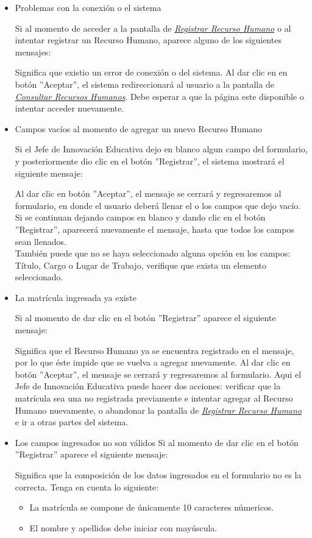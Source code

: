 \begin{itemize}
	\item Problemas con la conexión o el sistema

	Si al momento de acceder a la pantalla de \hyperlink{registrarrh}{\textit{Registrar Recurso Humano}} o al intentar registrar un Recurso Humano, aparece alguno de los siguientes mensajes:

	Significa que existio un error de conexión o del sistema. Al dar clic en en botón ''Aceptar'', el sistema redireccionará al usuario a la pantalla de \hyperlink{consultarrh}{\textit{Consultar Recursos Humanos}}. Debe esperar a que la página este disponible o intentar acceder nuevamente.

	\item Campos vacíos al momento de agregar un nuevo Recurso Humano

	Si el Jefe de Innovación Educativa dejo en blanco algun campo del formulario, y posteriormente dio clic en el botón ''Registrar'', el sistema mostrará el siguiente mensaje:

	Al dar clic en botón ''Aceptar'', el mensaje se cerrará y regresaremos al formulario, en donde el usuario deberá llenar el o los campos que dejo vacío. Si se continuan dejando campos en blanco y dando clic en el botón ''Registrar'', aparecerá nuevamente el mensaje, hasta que todos los campos sean llenados.\\

	También puede que no se haya seleccionado alguna opción en los campos: Título, Cargo o Lugar de Trabajo, verifique que exista un elemento seleccionado.

	\item La matrícula ingresada ya existe

	Si al momento de dar clic en el botón ''Registrar'' aparece el siguiente mensaje:

	Significa que el Recurso Humano ya se encuentra registrado en el mensaje, por lo que éste impide que se vuelva a agregar nuevamente. Al dar clic en botón ''Aceptar'', el mensaje se cerrará y regresaremos al formulario. Aqui el Jefe de Innovación Educativa puede hacer dos acciones: verificar que la matrícula sea una no registrada previamente e intentar agregar al Recurso Humano nuevamente, o abandonar la pantalla de \hyperlink{registrarrh}{\textit{Registrar Recurso Humano}} e ir a otras partes del sistema.

	\item Los campos ingresados no son válidos
	Si al momento de dar clic en el botón ''Registrar'' aparece el siguiente mensaje:

	Significa que la composición de los datos ingresados en el formulario no es la correcta. Tenga en cuenta lo siguiente:

	\begin{itemize}
		\item La matrícula se compone de únicamente 10 caracteres númericos.
		\item El nombre y apellidos debe iniciar con mayúscula.
	\end{itemize}


\end{itemize}

